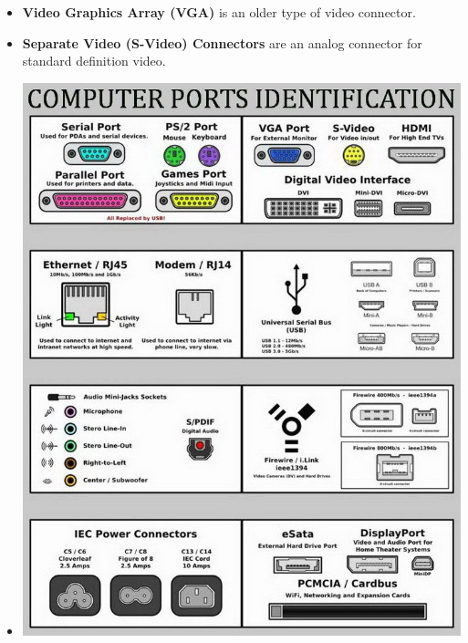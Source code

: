 \documentclass{article}
\begin{document}
\begin{itemize}
        \item \textbf{Video Graphics Array (VGA)} is an older type of video connector.
        \item \textbf{Separate Video (S-Video) Connectors} are an analog connector for standard definition video.
        \item[] \begin{center}
                    \includegraphics[width=(\textwidth / 2) - 15pt]{images/Connectors-1.jpg}

\end{center}
\end{itemize}
\end{document}
